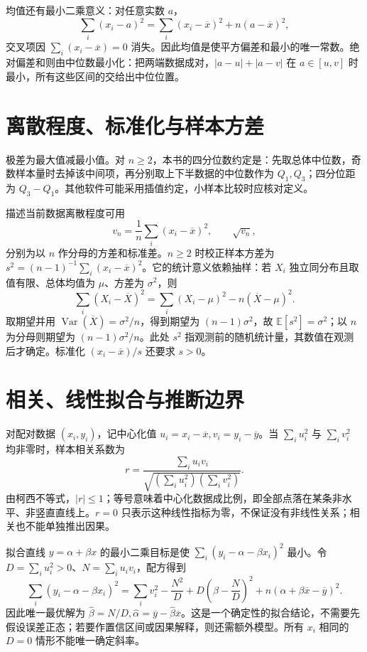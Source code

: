 均值还有最小二乘意义：对任意实数 $a$，
\[
 \sum_i(x_i-a)^2=\sum_i(x_i-\overline x)^2+n(a-\overline x)^2,
\]
交叉项因 $\sum_i(x_i-\overline x)=0$ 消失。因此均值是使平方偏差和最小的唯一常数。绝对偏差和则由中位数最小化：把两端数据成对，$|a-u|+|a-v|$ 在 $a\in[u,v]$ 时最小，所有这些区间的交给出中位位置。

\section{离散程度、标准化与样本方差}
极差为最大值减最小值。对 $n\ge2$，本书的四分位数约定是：先取总体中位数，奇数样本量时去掉该中间项，再分别取上下半数据的中位数作为 $Q_1,Q_3$；四分位距为 $Q_3-Q_1$。其他软件可能采用插值约定，小样本比较时应核对定义。

描述当前数据离散程度可用
\[
 v_n=\frac1n\sum_i(x_i-\overline x)^2,\qquad
 \sqrt{v_n},
\]
分别为以 $n$ 作分母的方差和标准差。$n\ge2$ 时校正样本方差为 $s^2=(n-1)^{-1}\sum_i(x_i-\overline x)^2$。它的统计意义依赖抽样：若 $X_i$ 独立同分布且取值有限、总体均值为 $\mu$、方差为 $\sigma^2$，则
\[
 \sum_i(X_i-\overline X)^2=\sum_i(X_i-\mu)^2-n(\overline X-\mu)^2.
\]
取期望并用 $\operatorname{Var}(\overline X)=\sigma^2/n$，得到期望为 $(n-1)\sigma^2$，故 $\mathbb E[s^2]=\sigma^2$；以 $n$ 为分母则期望为 $(n-1)\sigma^2/n$。此处 $s^2$ 指观测前的随机统计量，其数值在观测后才确定。标准化 $(x_i-\overline x)/s$ 还要求 $s>0$。

\section{相关、线性拟合与推断边界}
对配对数据 $(x_i,y_i)$，记中心化值 $u_i=x_i-\overline x,v_i=y_i-\overline y$。当 $\sum_i u_i^2$ 与 $\sum_i v_i^2$ 均非零时，样本相关系数为
\[
 r=\frac{\sum_i u_iv_i}{\sqrt{(\sum_i u_i^2)(\sum_i v_i^2)}}.
\]
由柯西不等式，$|r|\le1$；等号意味着中心化数据成比例，即全部点落在某条非水平、非竖直直线上。$r=0$ 只表示这种线性指标为零，不保证没有非线性关系；相关也不能单独推出因果。

拟合直线 $y=\alpha+\beta x$ 的最小二乘目标是使 $\sum_i(y_i-\alpha-\beta x_i)^2$ 最小。令 $D=\sum_i u_i^2>0$、$N=\sum_i u_iv_i$，配方得到
\[
 \sum_i(y_i-\alpha-\beta x_i)^2
 =\sum_i v_i^2-\frac{N^2}{D}
  +D\left(\beta-\frac ND\right)^2
  +n(\alpha+\beta\overline x-\overline y)^2.
\]
因此唯一最优解为 $\widehat\beta=N/D,\widehat\alpha=\overline y-\widehat\beta\overline x$。这是一个确定性的拟合结论，不需要先假设误差正态；若要作置信区间或因果解释，则还需额外模型。所有 $x_i$ 相同的 $D=0$ 情形不能唯一确定斜率。

